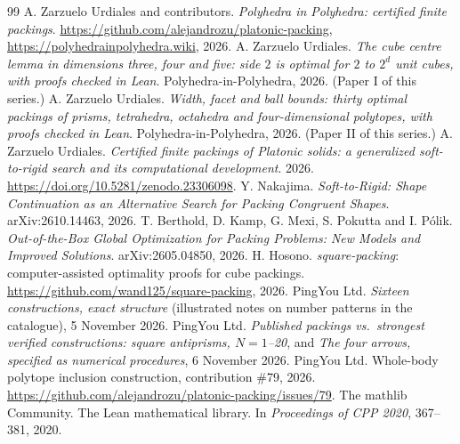 \documentclass[11pt,a4paper]{article}
\begin{document}
\begin{thebibliography}{99}
 A. Zarzuelo Urdiales and contributors. \emph{Polyhedra in Polyhedra: certified finite packings}. \url{https://github.com/alejandrozu/platonic-packing}, \url{https://polyhedrainpolyhedra.wiki}, 2026.
 A. Zarzuelo Urdiales. \emph{The cube centre lemma in dimensions three, four and five: side $2$ is optimal for $2$ to $2^d$ unit cubes, with proofs checked in Lean}. Polyhedra-in-Polyhedra, 2026. (Paper I of this series.)
 A. Zarzuelo Urdiales. \emph{Width, facet and ball bounds: thirty optimal packings of prisms, tetrahedra, octahedra and four-dimensional polytopes, with proofs checked in Lean}. Polyhedra-in-Polyhedra, 2026. (Paper II of this series.)
 A. Zarzuelo Urdiales. \emph{Certified finite packings of Platonic solids: a generalized soft-to-rigid search and its computational development}. 2026. \url{https://doi.org/10.5281/zenodo.23306098}.
 Y. Nakajima. \emph{Soft-to-Rigid: Shape Continuation as an Alternative Search for Packing Congruent Shapes}. arXiv:2610.14463, 2026.
 T. Berthold, D. Kamp, G. Mexi, S. Pokutta and I. P\'olik. \emph{Out-of-the-Box Global Optimization for Packing Problems: New Models and Improved Solutions}. arXiv:2605.04850, 2026.
 H. Hosono. \emph{square-packing}: computer-assisted optimality proofs for cube packings. \url{https://github.com/wand125/square-packing}, 2026.
 PingYou Ltd. \emph{Sixteen constructions, exact structure} (illustrated notes on number patterns in the catalogue), 5 November 2026.
 PingYou Ltd. \emph{Published packings vs.\ strongest verified constructions: square antiprisms, $N=1$--20}, and \emph{The four arrows, specified as numerical procedures}, 6 November 2026.
 PingYou Ltd. Whole-body polytope inclusion construction, contribution \#79, 2026. \url{https://github.com/alejandrozu/platonic-packing/issues/79}.
 The mathlib Community. The Lean mathematical library. In \emph{Proceedings of CPP 2020}, 367--381, 2020.
\end{thebibliography}
\end{document}
